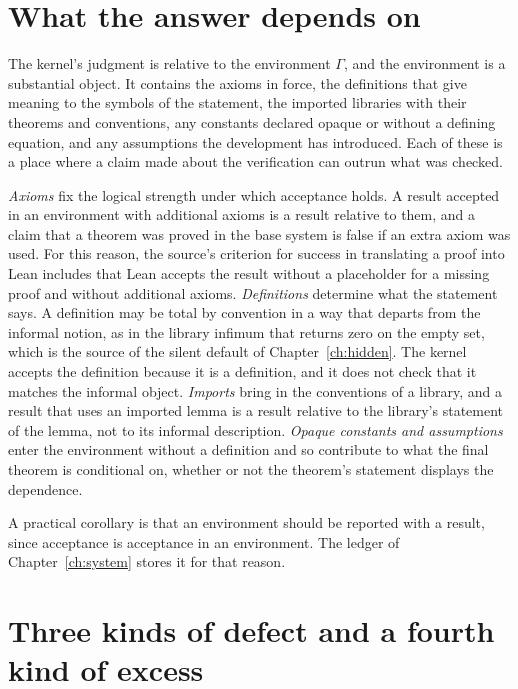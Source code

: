 \section{What the answer depends on}

The kernel's judgment is relative to the environment $\Gamma$, and the environment is a substantial object. It contains the axioms in force, the definitions that give meaning to the symbols of the statement, the imported libraries with their theorems and conventions, any constants declared opaque or without a defining equation, and any assumptions the development has introduced. Each of these is a place where a claim made about the verification can outrun what was checked.

\emph{Axioms} fix the logical strength under which acceptance holds. A result accepted in an environment with additional axioms is a result relative to them, and a claim that a theorem was proved in the base system is false if an extra axiom was used. For this reason, the source's criterion for success in translating a proof into Lean includes that Lean accepts the result without a placeholder for a missing proof and without additional axioms. \emph{Definitions} determine what the statement says. A definition may be total by convention in a way that departs from the informal notion, as in the library infimum that returns zero on the empty set, which is the source of the silent default of Chapter~\ref{ch:hidden}. The kernel accepts the definition because it is a definition, and it does not check that it matches the informal object. \emph{Imports} bring in the conventions of a library, and a result that uses an imported lemma is a result relative to the library's statement of the lemma, not to its informal description. \emph{Opaque constants and assumptions} enter the environment without a definition and so contribute to what the final theorem is conditional on, whether or not the theorem's statement displays the dependence.

A practical corollary is that an environment should be reported with a result, since acceptance is acceptance in an environment. The ledger of Chapter~\ref{ch:system} stores it for that reason.

\section{Three kinds of defect and a fourth kind of excess}

